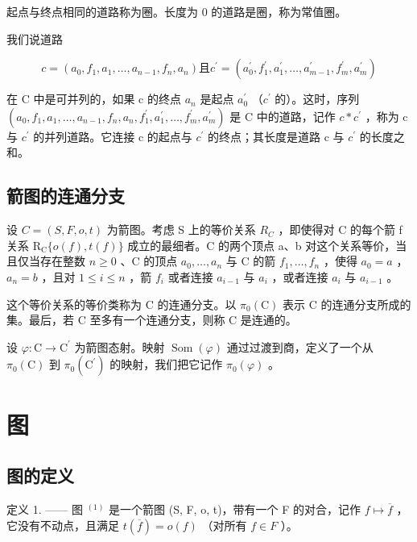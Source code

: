 起点与终点相同的道路称为圈。长度为 0 的道路是圈，称为常值圈。

我们说道路

\[
c = (a _ {0}, f _ {1}, a _ {1}, \ldots , a _ {n - 1}, f _ {n}, a _ {n}) \text{且} c ^ {\prime} = (a _ {0} ^ {\prime}, f _ {1} ^ {\prime}, a _ {1} ^ {\prime}, \ldots , a _ {m - 1} ^ {\prime}, f _ {m} ^ {\prime}, a _ {m} ^ {\prime})
\]

在 C 中是可并列的，如果 c 的终点 \(a_{n}\) 是起点 \(a_{0}^{\prime}\) （\(c^{\prime}\) 的）。这时，序列 \((a_{0}, f_{1}, a_{1}, \ldots, a_{n-1}, f_{n}, a_{n}, f_{1}^{\prime}, a_{1}^{\prime}, \ldots, f_{m}^{\prime}, a_{m}^{\prime})\) 是 C 中的道路，记作 \(c * c^{\prime}\) ，称为 c 与 \(c^{\prime}\) 的并列道路。它连接 c 的起点与 \(c^{\prime}\) 的终点；其长度是道路 c 与 \(c^{\prime}\) 的长度之和。

\subsection{箭图的连通分支}

设 \(C = (S, F, o, t)\) 为箭图。考虑 S 上的等价关系 \(R_{C}\) ，即使得对 C 的每个箭 f 关系 \(\mathrm{R}_{\mathrm{C}}\{o(f), t(f)\}\) 成立的最细者。C 的两个顶点 a、b 对这个关系等价，当且仅当存在整数 \(n \geqslant 0\) 、C 的顶点 \(a_{0}, \ldots, a_{n}\) 与 C 的箭 \(f_{1}, \ldots, f_{n}\) ，使得 \(a_{0} = a\) ，\(a_{n} = b\) ，且对 \(1 \leqslant i \leqslant n\) ，箭 \(f_{i}\) 或者连接 \(a_{i-1}\) 与 \(a_{i}\) ，或者连接 \(a_{i}\) 与 \(a_{i-1}\) 。

这个等价关系的等价类称为 C 的连通分支。以 \(\pi_0(\mathrm{C})\) 表示 C 的连通分支所成的集。最后，若 C 至多有一个连通分支，则称 C 是连通的。

设 \(\varphi\colon\mathrm{C}\to\mathrm{C}^{\prime}\) 为箭图态射。映射 \(\operatorname{Som}(\varphi)\) 通过过渡到商，定义了一个从 \(\pi_{0}(\mathrm{C})\) 到 \(\pi_{0}(\mathrm{C}^{\prime})\) 的映射，我们把它记作 \(\pi_{0}(\varphi)\) 。

\section{图}

\subsection{图的定义}

定义 1. —— 图 \(^{(1)}\) 是一个箭图 (S, F, o, t)，带有一个 F 的对合，记作 \(f \mapsto \overline{f}\) ，它没有不动点，且满足 \(t(\overline{f}) = o(f)\) （对所有 \(f \in F\) ）。


